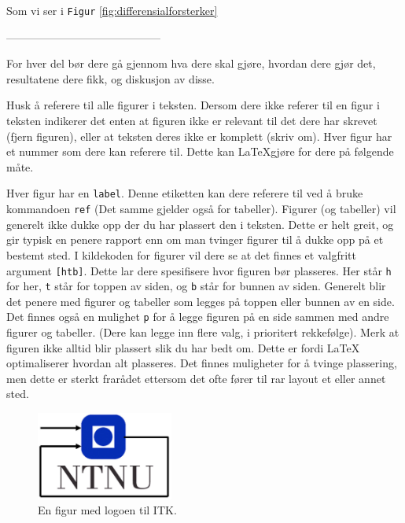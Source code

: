 Som vi ser i \texttt{Figur} \ref{fig:differensialforsterker}


------------------------------------------


For hver del bør dere gå gjennom hva dere skal gjøre, hvordan dere gjør det, resultatene dere fikk,
og diskusjon av disse. 

Husk å referere til alle figurer i teksten. Dersom dere ikke referer til en 
figur i teksten indikerer det enten at figuren ikke er relevant til det dere
har skrevet (fjern figuren), eller at teksten deres ikke er komplett (skriv om).
Hver figur har et nummer som dere kan referere til. Dette kan \LaTeX gjøre for dere
på følgende måte. 



Hver figur har en \texttt{label}. Denne etiketten kan dere
referere til ved å bruke kommandoen \texttt{ref} (Det samme gjelder også for tabeller).
Figurer (og tabeller) vil generelt ikke dukke opp der du har plassert den i teksten.
Dette er helt greit, og gir typisk en penere rapport enn om man tvinger figurer til å dukke opp på et bestemt sted. I kildekoden for figurer vil dere se at det finnes et
valgfritt argument \verb+[htb]+. Dette lar dere spesifisere hvor figuren bør plasseres. Her står \verb+h+ for her, \verb+t+ står for toppen av siden, og \verb+b+
står for bunnen av siden. Generelt blir det penere med figurer og tabeller som legges på toppen eller bunnen av en side. Det finnes også en mulighet \verb+p+ for å legge figuren på en side sammen med andre figurer og tabeller. (Dere kan legge inn flere valg, i prioritert rekkefølge). Merk at figuren ikke alltid blir plassert slik du har bedt om. Dette er fordi LaTeX optimaliserer hvordan alt plasseres. Det finnes muligheter for å tvinge plassering, men dette er sterkt frarådet ettersom det ofte fører til rar layout et eller annet sted.




\begin{figure}[b]
	\centering
	\includegraphics[width=0.40\textwidth]{figurer/itk_ntnu.jpg}
	\caption{En figur med logoen til ITK.}
\label{fig:layers_openloop}
\end{figure}
